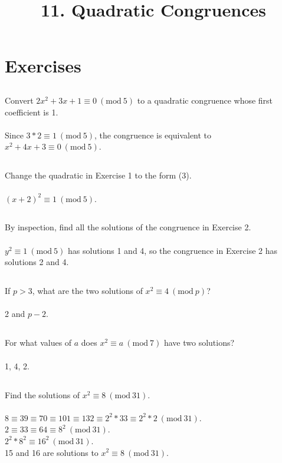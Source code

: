 \documentclass{article} \usepackage{amsmath}
\begin{document}
\newcommand{\Z}{\mathbb{Z}}
\newcommand{\s}{\sigma}
\newcommand{\p}{\phi}
\newcommand{\e}{\equiv}
\newcommand{\m}[1]{\ (\mathrm{mod}\ #1)}

\title{11. Quadratic Congruences}
\section{Exercises}

\subsection{}
Convert $2x^2 + 3x + 1 \e 0 \m{5}$ to a quadratic congruence
whose first coefficient is 1.\\~\\
Since $3*2 \e 1 \m{5}$, the congruence is equivalent to
$x^2 + 4x + 3 \e 0 \m{5}$.

\subsection{}
Change the quadratic in Exercise 1 to the form (3).\\~\\
$(x + 2)^2 \e 1 \m{5}$.

\subsection{}
By inspection, find all the solutions of the congruence in Exercise 2.\\~\\
$y^2 \e 1 \m{5}$ has solutions 1 and 4, so the congruence in Exercise 2
has solutions 2 and 4.

\subsection{}
If $p > 3$, what are the two solutions of $x^2 \e 4 \m{p}$?\\~\\
2 and $p - 2$.

\subsection{}
For what values of $a$ does $x^2 \e a \m{7}$ have two solutions?\\~\\
1, 4, 2.

\subsection{}
Find the solutions of $x^2 \e 8 \m{31}$.\\~\\
$8 \e 39 \e 70 \e 101 \e 132 \e 2^2 * 33 \e 2^2 * 2 \m{31}$.\\
$2 \e 33 \e 64 \e 8^2 \m{31}$.\\
$2^2 * 8^2 \e 16^2 \m{31}$.\\
15 and 16 are solutions to $x^2 \e 8 \m{31}$.
\end{document}
